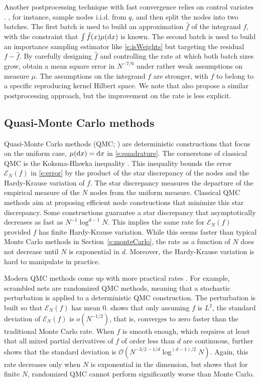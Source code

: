 \documentclass[a4paper,11pt]{article}
\numberwithin{equation}{section}
\theoremstyle{definition}
\newcommand{\rev}[1]{#1}
\newcommand{\cO}{\mathcal{O}}
\renewcommand{\d}{ {\rm d}}
\def\cE{\mathscr{E}}
\begin{document}
\rev{Another postprocessing technique with fast convergence relies on control variates \citep{GlSz02}. \citet*{OaGiCh17}, for instance, sample nodes i.i.d. from $q$, and then split the nodes into two batches. The first batch is used to build an approximation $\hat f$ of the integrand $f$, with the constraint that $\int \hat f(x)\mu(\d x)$ is known. The second batch is used to build an importance sampling estimator like \eqref{e:isWeights} but targeting the residual $f-\hat{f}$. By carefully designing $\hat{f}$ and controlling the rate at which both batch sizes grow, \cite[Theorem 2]{OaGiCh17} obtain a mean square error in $N^{-7/6}$ under rather weak assumptions on measure $\mu$. The assumptions on the integrand $f$ are stronger, with $f$ to belong to a specific reproducing kernel Hilbert space. We note that \cite{LiLe17} also propose a similar postprocessing approach, but the improvement on the rate is less explicit.}


\subsection{Quasi-Monte Carlo methods}
\label{s:qmc}
Quasi-Monte Carlo methods (QMC; \citep{DiPi10, DiKuSl13}) are deterministic constructions that
focus on the uniform case, $\mu(\d x) = \d x$ in \eqref{e:quadrature}. The
cornerstone of classical QMC is the Koksma-Hlawka inequality \cite[Equation
3.15]{DiKuSl13}. This inequality bounds the error $\cE_N(f)$ in \eqref{e:error} by the product of the star discrepancy of the nodes and the Hardy-Krause variation of $f$. The star discrepancy measures the
departure of the empirical measure of the $N$ nodes from the uniform measure.
Classical QMC methods aim at proposing efficient node constructions that
minimize this star discrepancy. Some constructions guarantee a star discrepancy that
asymptotically decreases as fast as $N^{-1}\log^{d-1}N$. This implies the same rate for $\cE_N(f)$
provided $f$ has finite Hardy-Krause variation. While this seems faster than typical Monte
Carlo methods in Section~\ref{s:monteCarlo}, the rate as a function of $N$ does
not decrease until $N$ is exponential in $d$. Moreover, the Hardy-Krause variation is hard to manipulate in practice.

Modern QMC methods come up with more practical rates \citep{DiKuSl13}. For example, scrambled nets \citep{Owe97,Owe08} are randomized QMC methods, meaning that a stochastic
perturbation is applied to a deterministic QMC construction. The perturbation is
built so that $\cE_N(f)$ has mean $0$. \cite{Owe97} shows that
only assuming $f$ is $L^2$, the standard deviation of $\cE_N(f)$ is $o(N^{-1/2})$, that is,
converges to zero faster than the traditional Monte Carlo rate. When $f$ is
smooth enough, which requires at least that all mixed partial derivatives of $f$ of order less than $d$ are continuous, \cite{Owe08} further shows that the standard deviation is $\cO(N^{-3/2-1/d}\log^{(d-1)/2} N)$. Again, this rate decreases only when $N$ is exponential in the dimension, but \cite{Owe97} shows that for finite $N$, randomized QMC cannot perform significantly worse than Monte Carlo.
\end{document}
